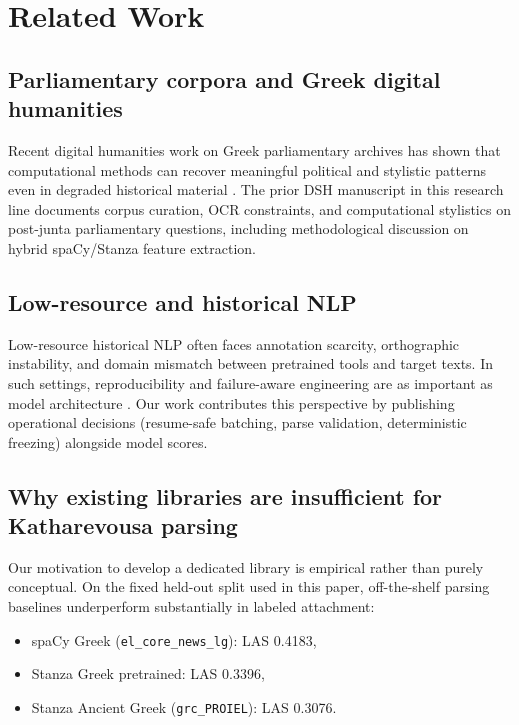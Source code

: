 \section{Related Work}



\subsection{Parliamentary corpora and Greek digital humanities}



Recent digital humanities work on Greek parliamentary archives has shown that computational methods can recover meaningful political and stylistic patterns even in degraded historical material \cite{barmpounis2024,fitsilis2024}. The prior DSH manuscript in this research line documents corpus curation, OCR constraints, and computational stylistics on post-junta parliamentary questions, including methodological discussion on hybrid spaCy/Stanza feature extraction.



\subsection{Low-resource and historical NLP}



Low-resource historical NLP often faces annotation scarcity, orthographic instability, and domain mismatch between pretrained tools and target texts. In such settings, reproducibility and failure-aware engineering are as important as model architecture \cite{grimmer2013}. Our work contributes this perspective by publishing operational decisions (resume-safe batching, parse validation, deterministic freezing) alongside model scores.



\subsection{Why existing libraries are insufficient for Katharevousa parsing}



Our motivation to develop a dedicated library is empirical rather than purely conceptual. On the fixed held-out split used in this paper, off-the-shelf parsing baselines underperform substantially in labeled attachment:

\begin{itemize}[leftmargin=1.25em]

  \item spaCy Greek (\texttt{el\_core\_news\_lg}): LAS 0.4183,

  \item Stanza Greek pretrained: LAS 0.3396,

  \item Stanza Ancient Greek (\texttt{grc\_PROIEL}): LAS 0.3076.

\end{itemize}



